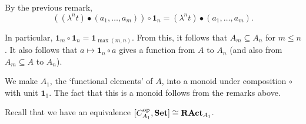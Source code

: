 \begin{corollary}
  By the previous remark,
  \[ ((\lambda^n t) \bullet (a_1, \dots, a_m)) \circ \mathbf 1_n = (\lambda^n t) \bullet (a_1, \dots, a_m). \]
\end{corollary}
\begin{corollary}
  In particular, $ \mathbf 1_m \circ \mathbf 1_n = \mathbf 1_{\max(m, n)} $. From this, it follows that $ A_m \subseteq A_n $ for $ m \leq n $. It also follows that $ a \mapsto \mathbf 1_n \circ a $ gives a function from $ A $ to $ A_n $ (and also from $ A_m \subseteq A $ to $ A_n $).
\end{corollary}

\begin{definition}
  We make $ A_1 $, the `functional elements' of $ A $, into a monoid under composition $ \circ $ with unit $ \mathbf 1_1 $. The fact that this is a monoid follows from the remarks above.
\end{definition}

Recall that we have an equivalence $ [C_{A_1}^{\text{op}}, \mathbf{Set}] \cong \mathbf{RAct}_{A_1} $.

